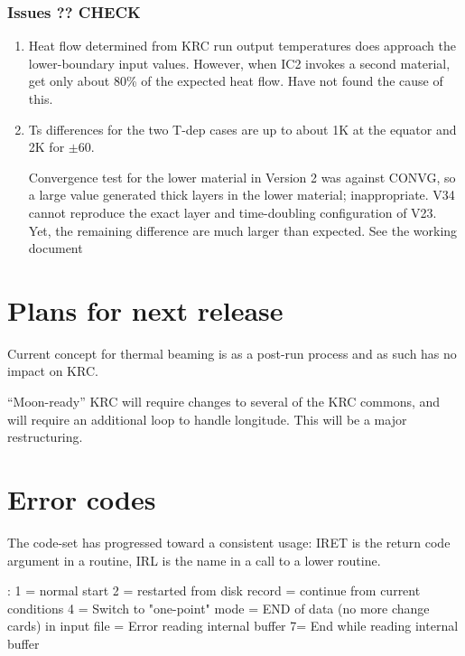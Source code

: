 \documentclass{article}
\begin{document}
\subsubsection{Issues ?? CHECK \label{issu}}  %
\begin{enumerate}    %
 \item 
Heat flow determined from KRC run output temperatures does approach the
lower-boundary input values. However, when IC2 invokes a second material, get
only about 80\% of the expected heat flow. Have not found the cause of this.
 \item 
Ts differences for the two T-dep cases are up to about 1K at the equator and 2K
for $\pm 60$\qd.

Convergence test for the lower material in Version 2 was against CONVG, so a
large value generated thick layers in the lower material; inappropriate.  V34
cannot reproduce the exact layer and time-doubling configuration of V23. Yet,
the remaining difference are much larger than expected. See the working document

\end{enumerate}

\section{Plans for next release \label{plans}} %

Current concept for thermal beaming is as a post-run process and as such has no
impact on KRC.

``Moon-ready'' KRC will require changes to several of the KRC commons, and will
require an additional loop to handle longitude. This will be a major
restructuring.


\section{ Error codes}
 The code-set has progressed toward a consistent usage: IRET is the return code argument in a routine,
 IRL is the name in a call to a lower routine.

: 1 = normal start    2 = restarted from disk record
 = continue from current conditions  4 = Switch to "one-point" mode
 = END of data (no more change cards) in input file
= Error reading internal buffer  7= End while reading internal buffer
\end{document}
